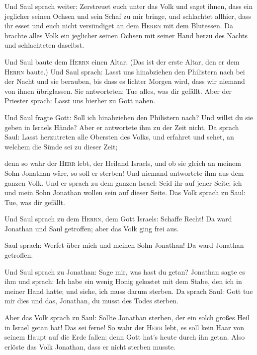  Und Saul sprach weiter: Zerstreuet euch unter das Volk
und saget ihnen, dass ein jeglicher seinen Ochsen und sein Schaf zu mir
bringe, und schlachtet allhier, dass ihr esset und euch nicht
versündiget an dem \textsc{Herrn} mit dem Blutessen. Da brachte alles
Volk ein jeglicher seinen Ochsen mit seiner Hand herzu des Nachts und
schlachteten daselbst.

 Und Saul baute dem \textsc{Herrn} einen Altar. (Das ist
der erste Altar, den er dem \textsc{Herrn} baute.)  Und
Saul sprach: Lasst uns hinabziehen den Philistern nach bei der Nacht und
sie berauben, bis dass es lichter Morgen wird, dass wir niemand von
ihnen übriglassen. Sie antworteten: Tue alles, was dir gefällt. Aber der
Priester sprach: Lasst uns hierher zu Gott nahen.

 Und Saul fragte Gott: Soll ich hinabziehen den
Philistern nach? Und willst du sie geben in Israels Hände? Aber er
antwortete ihm zu der Zeit nicht.  Da sprach Saul: Lasst
herzutreten alle Obersten des Volks, und erfahret und sehet, an welchem
die Sünde sei zu dieser Zeit;

 denn so wahr der \textsc{Herr} lebt, der Heiland
Israels, und ob sie gleich an meinem Sohn Jonathan wäre, so soll er
sterben! Und niemand antwortete ihm aus dem ganzen Volk. 
Und er sprach zu dem ganzen Israel: Seid ihr auf jener Seite; ich und
mein Sohn Jonathan wollen sein auf dieser Seite. Das Volk sprach zu
Saul: Tue, was dir gefällt.

 Und Saul sprach zu dem \textsc{Herrn}, dem Gott Israels:
Schaffe Recht! Da ward Jonathan und Saul getroffen; aber das Volk ging
frei aus.

 Saul sprach: Werfet über mich und meinen Sohn Jonathan!
Da ward Jonathan getroffen.

 Und Saul sprach zu Jonathan: Sage mir, was hast du
getan? Jonathan sagte es ihm und sprach: Ich habe ein wenig Honig
gekostet mit dem Stabe, den ich in meiner Hand hatte; und siehe, ich
muss darum sterben.  Da sprach Saul: Gott tue mir dies
und das, Jonathan, du musst des Todes sterben.

 Aber das Volk sprach zu Saul: Sollte Jonathan sterben,
der ein solch großes Heil in Israel getan hat! Das sei ferne! So wahr
der \textsc{Herr} lebt, es soll kein Haar von seinem Haupt auf die Erde
fallen; denn Gott hat's heute durch ihn getan. Also erlöste das Volk
Jonathan, dass er nicht sterben musste.

